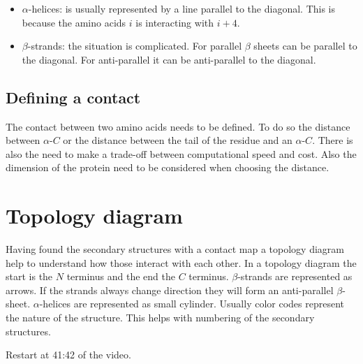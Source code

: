 \begin{multicols}{2}
	\begin{itemize}
		\item $\alpha$-helices: is usually represented by a line parallel to the diagonal.
			This is because the amino acids $i$ is interacting with $i+4$.
		\item $\beta$-strands: the situation is complicated.
			For parallel $\beta$ sheets can be parallel to the diagonal.
			For anti-parallel it can be anti-parallel to the diagonal.
	\end{itemize}
\end{multicols}

	\subsection{Defining a contact}
	The contact between two amino acids needs to be defined.
	To do so the distance between $\alpha$-$C$ or the distance between the tail of the residue and an $\alpha$-$C$.
	There is also the need to make a trade-off between computational speed and cost.
	Also the dimension of the protein need to be considered when choosing the distance.

\section{Topology diagram}
Having found the secondary structures with a contact map a topology diagram help to understand how those interact with each other.
In a topology diagram the start is the $N$ terminus and the end the $C$ terminus.
$\beta$-strands are represented as arrows.
If the strands always change direction they will form an anti-parallel $\beta$-sheet.
$\alpha$-helices are represented as small cylinder.
Usually color codes represent the nature of the structure.
This helps with numbering of the secondary structures.

Restart at 41:42 of the video.
